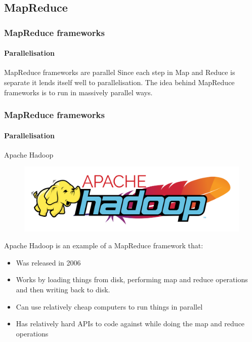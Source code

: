 \documentclass[aspectratio=169,usenames,dvipsnames]{beamer}
\begin{document}
    \subsection{MapReduce}
    \begin{frame}
        \frametitle{MapReduce frameworks}
        \framesubtitle{Parallelisation}
        \begin{block}{MapReduce frameworks are parallel}
        Since each step in Map and Reduce is separate it lends itself well to
        parallelisation. The idea behind MapReduce frameworks is to run in
        massively parallel ways.
        \end{block}
    \end{frame}
       
    \begin{frame}
        \frametitle{MapReduce frameworks}
        \framesubtitle{Parallelisation}
        \begin{block}{Apache Hadoop}
        \begin{figure}
        \vspace{-1.2\baselineskip}
        \includegraphics[width=1\linewidth]{figures/hadoop.png}
        \end{figure}
        Apache Hadoop is an example of a MapReduce framework that:
        \begin{itemize}
            \item Was released in 2006
            \item Works by loading things from disk, performing map and reduce operations and then writing back to disk.
            \item Can use relatively cheap computers to run things in parallel
            \item Has relatively hard APIs to code against while doing the map and reduce operations
        \end{itemize}
        \end{block}
    \end{frame}
\end{document}
